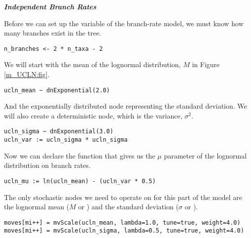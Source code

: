 

\textbf{\textit{Independent Branch Rates}}

Before we can set up the variable of the branch-rate model, we must know how many branches exist in the tree.
{\tt \begin{snugshade*}
\begin{lstlisting}
n_branches <- 2 * n_taxa - 2
\end{lstlisting}
\end{snugshade*}}

We will start with the mean of the lognormal distribution, $M$ in Figure \ref{m_UCLN:fig}.
{\tt \begin{snugshade*}
\begin{lstlisting}
ucln_mean ~ dnExponential(2.0)
\end{lstlisting}
\end{snugshade*}}

And the exponentially distributed node representing the standard deviation.
We will also create a deterministic node, which is the variance, $\sigma^2$.
{\tt \begin{snugshade*}
\begin{lstlisting}
ucln_sigma ~ dnExponential(3.0)
ucln_var := ucln_sigma * ucln_sigma
\end{lstlisting}
\end{snugshade*}}

Now we can declare the function that gives us the $\mu$ parameter of the lognormal distribution on branch rates.
{\tt \begin{snugshade*}
\begin{lstlisting}
ucln_mu := ln(ucln_mean) - (ucln_var * 0.5)
\end{lstlisting}
\end{snugshade*}}

The only stochastic nodes we need to operate on for this part of the model are the lognormal mean ($M$ or ) and the standard deviation ($\sigma$ or ).
{\tt \begin{snugshade*}
\begin{lstlisting}
moves[mi++] = mvScale(ucln_mean, lambda=1.0, tune=true, weight=4.0)
moves[mi++] = mvScale(ucln_sigma, lambda=0.5, tune=true, weight=4.0)
\end{lstlisting}
\end{snugshade*}}

